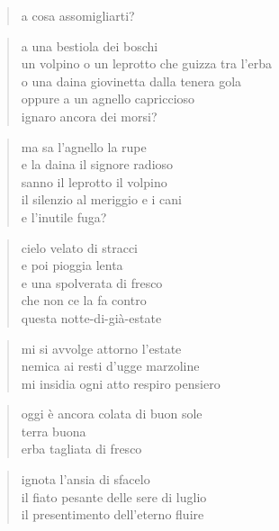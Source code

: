 \clearpage


\begin{verse}
    a cosa assomigliarti?
\end{verse}

\begin{verse}
    a una bestiola dei boschi\\
    un volpino o un leprotto che guizza tra l'erba\\
    o una daina giovinetta dalla tenera gola\\
    oppure a un agnello capriccioso\\
    ignaro ancora dei morsi?
\end{verse}

\begin{verse}
    ma sa l'agnello la rupe\\
    e la daina il signore radioso\\
    sanno il leprotto il volpino\\
    il silenzio al meriggio e i cani\\
    e l'inutile fuga?
\end{verse}


\begin{verse}
    cielo velato di stracci\\
    e poi pioggia lenta\\
    e una spolverata di fresco\\
    che non ce la fa contro\\
    questa notte-di-già-estate
\end{verse}

\clearpage


\begin{verse}
    mi si avvolge attorno l'estate\\
    nemica ai resti d'ugge marzoline\\
    mi insidia ogni atto respiro pensiero
\end{verse}

\begin{verse}
    oggi è ancora colata di buon sole\\
    terra buona\\
    erba tagliata di fresco
\end{verse}

\begin{verse}
    ignota l'ansia di sfacelo\\
    il fiato pesante delle sere di luglio\\
    il presentimento dell'eterno fluire
\end{verse}

